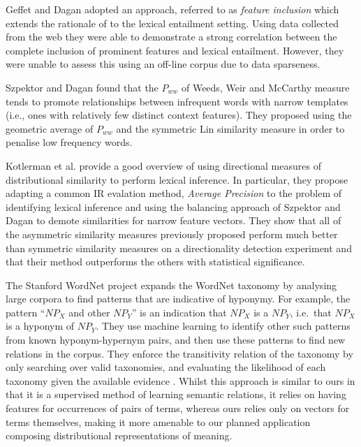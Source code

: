\documentclass[11pt]{article}
\begin{document}
Geffet and Dagan  adopted an approach, referred to as \emph{feature inclusion} which extends the rationale of  to the lexical entailment setting.    Using data collected from the web they were able to demonstrate a strong correlation between the complete inclusion of prominent features and lexical entailment.  However, they were unable to assess this using an off-line corpus due to data sparseness.

Szpektor and Dagan  found that the $P_{ww}$ of Weeds, Weir and McCarthy measure tends to promote relationships between infrequent words with narrow templates (i.e., ones with relatively few distinct context features).  They proposed using the geometric average of $P_{ww}$ and the symmetric Lin similarity measure in order to penalise low frequency words.   

Kotlerman et al.  provide a good overview of using directional measures of distributional similarity to perform lexical inference.  In particular, they propose adapting a common IR evalation method, \emph{Average Precision} to the problem of identifying lexical inference and using the balancing approach of Szpektor and Dagan  to demote similarities for narrow feature vectors.  They show that all of the asymmetric similarity measures previously proposed perform much better than symmetric similarity measures on a directionality detection experiment and that their method outperforms the others with statistical significance.

The Stanford WordNet project \cite{Snow:04} expands the WordNet
taxonomy by analysing large corpora to find patterns that are
indicative of hyponymy. For example, the pattern ``$\mathit{NP}_X$ and
other $\mathit{NP}_Y$'' is an indication that $\mathit{NP}_X$ is a
$\mathit{NP}_Y$, i.e.~that $\mathit{NP}_X$ is a hyponym of
$\mathit{NP}_Y$. They use machine learning to identify other such
patterns from known hyponym-hypernym pairs, and then use these
patterns to find new relations in the corpus. They enforce the
transitivity relation of the taxonomy by only searching over valid
taxonomies, and evaluating the likelihood of each taxonomy given the
available evidence \cite{Snow:06}. Whilst this approach is similar to
ours in that it is a supervised method of learning semantic relations,
it relies on having features for occurrences of pairs of terms,
whereas ours relies only on vectors for terms themselves, making it
more amenable to our planned application composing distributional
representations of meaning.
\end{document}
